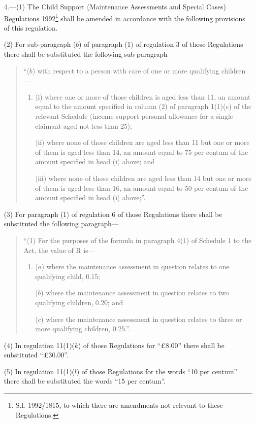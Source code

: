 \documentclass[a4paper]{article}
\begin{document}
4.—(1) The Child Support (Maintenance Assessments and Special Cases) Regulations 1992\footnote{\frenchspacing S.I. 1992/1815, to which there are amendments not relevant to these Regulations.} shall be amended in accordance with the following provisions of this regulation.

(2) For sub-paragraph ($b$) of paragraph (1) of regulation 3 of those Regulations there shall be substituted the following sub-paragraph—
\begin{quotation}
“($b$) with respect to a person with care of one or more qualifying children—
\begin{enumerate}\item[]
(i) where one or more of those children is aged less than 11, an amount equal to the amount specified in column (2) of paragraph 1(1)($e$) of the relevant Schedule (income support personal allowance for a single claimant aged not less than 25);

(ii) where none of those children are aged less than 11 but one or more of them is aged less than 14, an amount equal to 75 per centum of the amount specified in head (i) above; and

(iii) where none of those children are aged less than 14 but one or more of them is aged less than 16, an amount equal to 50 per centum of the amount specified in head (i) above;”.
\end{enumerate}
\end{quotation}

(3) For paragraph (1) of regulation 6 of those Regulations there shall be substituted the following paragraph—
\begin{quotation}
“(1) For the purposes of the formula in paragraph 4(1) of Schedule 1 to the Act, the value of R is—
\begin{enumerate}\item[]
($a$) where the maintenance assessment in question relates to one qualifying child, 0.15;

($b$) where the maintenance assessment in question relates to two qualifying children, 0.20; and

($c$) where the maintenance assessment in question relates to three or more qualifying children, 0.25.”.
\end{enumerate}
\end{quotation}

(4) In regulation 11(1)($k$) of those Regulations for “£8.00” there shall be substituted “£30.00”.

(5) In regulation 11(1)($l$) of those Regulations for the words “10 per centum” there shall be substituted the words “15 per centum”.
\end{document}

